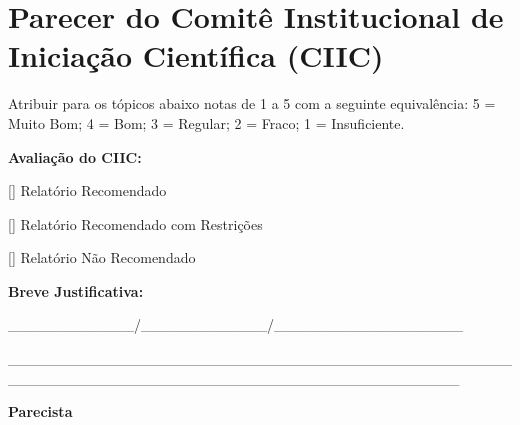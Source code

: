\documentclass[12pt]{article}
\begin{document}
\section{Parecer do Comitê Institucional de Iniciação Científica (CIIC)}

Atribuir para os tópicos abaixo notas de 1 a 5 com a seguinte equivalência:
5 = Muito Bom; 4 = Bom; 3 = Regular; 2 = Fraco; 1 = Insuficiente.


\begin{table}[h]
\centering
{}
\end{table}


\textbf{Avaliação do CIIC:}

[\hspace{0.5cm}] Relatório Recomendado


[\hspace{0.5cm}] Relatório Recomendado com Restrições


[\hspace{0.5cm}] Relatório Não Recomendado

\noindent
\textbf{Breve Justificativa:}
\vspace{0.5cm}

\noindent\hrulefill 

\vspace{0.5cm}

\noindent\hrulefill 

\vspace{0.5cm}

\noindent\hrulefill 

\vspace{2cm}
\begin{center}


\_\_\_\_\_\_\_\_\_\_\_\_/\_\_\_\_\_\_\_\_\_\_\_\_/\_\_\_\_\_\_\_\_\_\_\_\_\_\_\_\_\_\_
\vspace{1.5cm}

\_\_\_\_\_\_\_\_\_\_\_\_\_\_\_\_\_\_\_\_\_\_\_\_\_\_\_\_\_\_\_\_\_\_\_\_\_\_\_\_\_\_\_\_\_\_\_\_\_\_\_\_\_\_\_\_\_\_\_\_\_\_\_\_\_\_\_\_\_\_\_\_\_\_\_\_\_\_\_\_\_\_\_\_\_\_\_\_\_\_\_

\textbf{Parecista}
\end{center}
\end{document}
